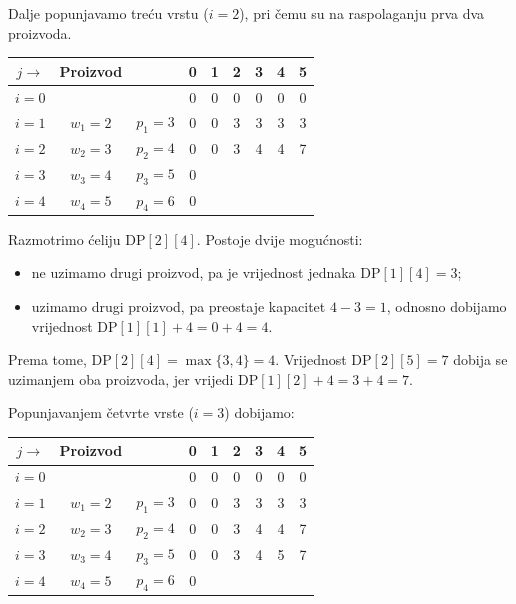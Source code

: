 \medskip

Dalje popunjavamo treću vrstu ($i=2$), pri čemu su na raspolaganju prva dva proizvoda.

\begin{table}[H]
	\centering
	\begin{tabular}{|c|cc|cccccc|}\hline
		$j\rightarrow$ & Proizvod & & 0 & 1 & 2 & 3 & 4 & 5 \\ \hline
		$i=0$ & & & 0 & 0 & 0 & 0 & 0 & 0 \\
		$i=1$ & $w_1=2$ & $p_1=3$ & 0 & 0 & 3 & 3 & 3 & 3 \\
		$i=2$ & $w_2=3$ & $p_2=4$ & 0 & 0 & 3 & 4 & 4 & 7 \\
		$i=3$ & $w_3=4$ & $p_3=5$ & 0 & & & & & \\
		$i=4$ & $w_4=5$ & $p_4=6$ & 0 & & & & & \\ \hline
	\end{tabular}
\end{table}

Razmotrimo ćeliju $\textrm{DP}[2][4]$. Postoje dvije mogućnosti:

\begin{itemize}
	\item ne uzimamo drugi proizvod, pa je vrijednost jednaka $\textrm{DP}[1][4]=3$;
	\item uzimamo drugi proizvod, pa preostaje kapacitet $4-3=1$, odnosno dobijamo vrijednost $\textrm{DP}[1][1]+4=0+4=4.$
\end{itemize}

Prema tome, $\textrm{DP}[2][4]=\max\{3,4\}=4.$ Vrijednost $\textrm{DP}[2][5]=7$ dobija se uzimanjem oba proizvoda, jer vrijedi $\textrm{DP}[1][2]+4 = 3+4 = 7.$

\medskip

Popunjavanjem četvrte vrste ($i=3$) dobijamo:

\begin{table}[H]
	\centering
	\begin{tabular}{|c|cc|cccccc|}\hline
		$j\rightarrow$ & Proizvod & & 0 & 1 & 2 & 3 & 4 & 5 \\ \hline
		$i=0$ & & & 0 & 0 & 0 & 0 & 0 & 0 \\
		$i=1$ & $w_1=2$ & $p_1=3$ & 0 & 0 & 3 & 3 & 3 & 3 \\
		$i=2$ & $w_2=3$ & $p_2=4$ & 0 & 0 & 3 & 4 & 4 & 7 \\
		$i=3$ & $w_3=4$ & $p_3=5$ & 0 & 0 & 3 & 4 & 5 & 7 \\
		$i=4$ & $w_4=5$ & $p_4=6$ & 0 & & & & & \\ \hline
	\end{tabular}
\end{table}

